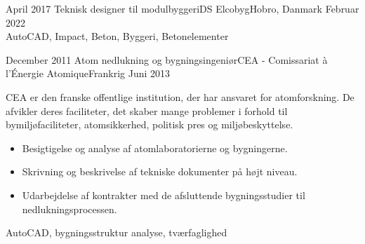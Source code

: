 \begin{experiences}
  \experience
  {April 2017}   {Teknisk designer til modulbyggeri}{DS Elcobyg}{Hobro, Danmark}
    {Februar 2022} {\\
                    }
                    {AutoCAD, Impact, Beton, Byggeri, Betonelementer}
  \emptySeparator

  
  \experience
    {December 2011} {Atom nedlukning og bygningsingeniør}{CEA - Comissariat à l'Énergie Atomique}{Frankrig}
    {Juni 2013}    
        { CEA er den franske offentlige institution, der har ansvaret for atomforskning. De afvikler deres faciliteter, det skaber mange problemer i forhold til bymiljøfaciliteter, atomsikkerhed, politisk pres og miljøbeskyttelse.
        \begin{itemize}
                        \item Besigtigelse og analyse af atomlaboratorierne og bygningerne.
                        \item Skrivning og beskrivelse af tekniske dokumenter på højt niveau.
                        \item Udarbejdelse af kontrakter med de afsluttende bygningsstudier til nedlukningsprocessen.
        \end{itemize}
        }
        {AutoCAD, bygningsstruktur analyse, tværfaglighed}
  \emptySeparator
  

\end{experiences}
